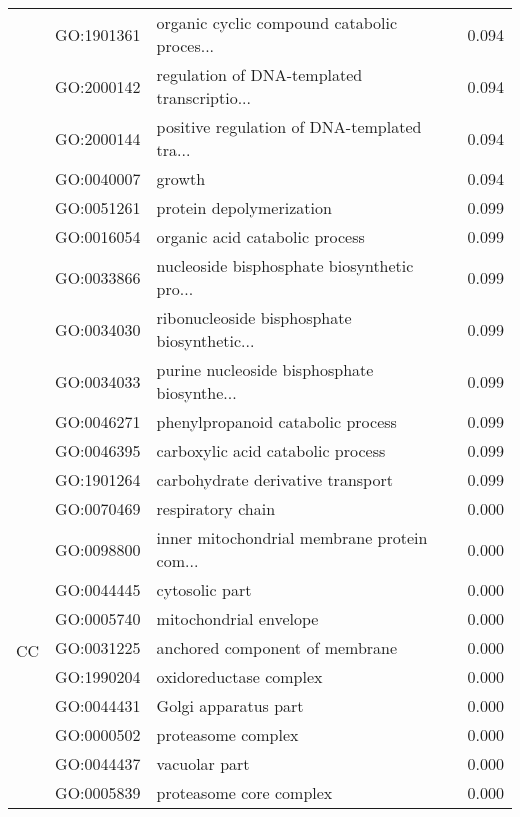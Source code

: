 \begin{longtable}{lllr}
   & GO:1901361 &  organic cyclic compound catabolic proces... &         0.094 \\
   & GO:2000142 &  regulation of DNA-templated transcriptio... &         0.094 \\
   & GO:2000144 &  positive regulation of DNA-templated tra... &         0.094 \\
   & GO:0040007 &                                       growth &         0.094 \\
   & GO:0051261 &                     protein depolymerization &         0.099 \\
   & GO:0016054 &               organic acid catabolic process &         0.099 \\
   & GO:0033866 &  nucleoside bisphosphate biosynthetic pro... &         0.099 \\
   & GO:0034030 &  ribonucleoside bisphosphate biosynthetic... &         0.099 \\
   & GO:0034033 &  purine nucleoside bisphosphate biosynthe... &         0.099 \\
   & GO:0046271 &            phenylpropanoid catabolic process &         0.099 \\
   & GO:0046395 &            carboxylic acid catabolic process &         0.099 \\
   & GO:1901264 &            carbohydrate derivative transport &         0.099 \\
\cline{1-4}
\multirow{39}{*}{CC} & GO:0070469 &                            respiratory chain &         0.000 \\
   & GO:0098800 &  inner mitochondrial membrane protein com... &         0.000 \\
   & GO:0044445 &                               cytosolic part &         0.000 \\
   & GO:0005740 &                       mitochondrial envelope &         0.000 \\
   & GO:0031225 &               anchored component of membrane &         0.000 \\
   & GO:1990204 &                       oxidoreductase complex &         0.000 \\
   & GO:0044431 &                         Golgi apparatus part &         0.000 \\
   & GO:0000502 &                           proteasome complex &         0.000 \\
   & GO:0044437 &                                vacuolar part &         0.000 \\
   & GO:0005839 &                      proteasome core complex &         0.000 \\

\end{longtable}
